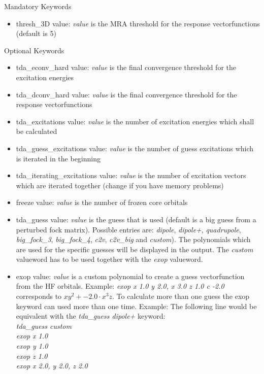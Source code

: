 \documentclass[10pt,a4paper]{scrartcl}
\begin{document}
Mandatory Keywords
\begin{itemize}
\item thresh\_3D value: \textit{value} is the MRA threshold for the response vectorfunctions (default is 5)
\end{itemize}
Optional Keywords
\begin{itemize}
\item tda\_econv\_hard value: \textit{value} is the final convergence threshold for the excitation energies
\item tda\_dconv\_hard value: \textit{value} is the final convergence threshold for the response vectorfunctions
\item tda\_excitations value: \textit{value} is the number of excitation energies which shall be calculated
\item tda\_guess\_excitations value: \textit{value} is the number of guess excitations which is iterated in the beginning
\item tda\_iterating\_excitations value: \textit{value} is the number of excitation vectors which are iterated together (change if you have memory problems)
\item freeze value: \textit{value} is the number of frozen core orbitals
\item tda\_guess value: \textit{value} is the guess that is used (default is a big guess from a perturbed fock matrix). Possible entries are: \textit{dipole}, \textit{dipole+}, \textit{quadrupole}, \textit{big\_fock\_3}, \textit{big\_fock\_4}, \textit{c2v}, \textit{c2v\_big} and \textit{custom}).
The polynomials which are used for the specific guesses will be displayed in the output. The \textit{custom} valueword has to be used together with the \textit{exop} valueword.
\item exop value: \textit{value} is a custom polynomial to create a guess vectorfunction from the HF orbitals.
Example: \textit{exop x 1.0 y 2.0, x 3.0 z 1.0 c -2.0} corresponds to $xy^2 + -2.0\cdot x^3z$.
To calculate more than one guess the exop keyword can used more than one time.
Example: The following line would be equivalent with the \textit{tda\_guess dipole+} keyword: \\
\textit{tda\_guess custom} \\
\textit{exop x 1.0}\\
\textit{exop y 1.0}\\
\textit{exop z 1.0}\\
\textit{exop x 2.0, y 2.0, z 2.0}
\end{itemize}
\clearpage
\end{document}
